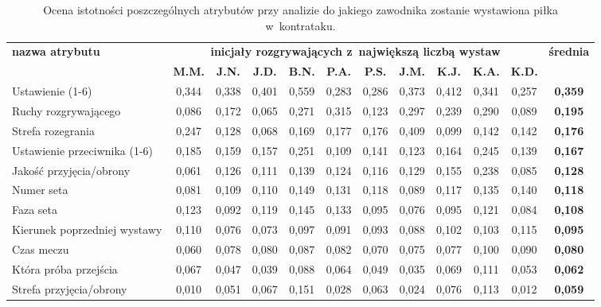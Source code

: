 \documentclass[a4paper,twoside,12pt]{book}
\begin{document}
\begin{table}
\centering
\caption{Ocena istotności poszczególnych atrybutów przy analizie do jakiego zawodnika zostanie wystawiona piłka w~kontrataku.}
\label{tab:atrybutyRZawodnikKontra}
\begin{adjustbox}{angle=90}
\begin{tabular}{|l|c|c|c|c|c|c|c|c|c|c|c|}
\hline
\multirow{2}{*}{\textbf{nazwa atrybutu}} &
\multicolumn{10}{c|}{\textbf{inicjały rozgrywających z~największą liczbą wystaw}} & 
\multirow{2}{*}{\textbf{średnia}}\\
\cline{2-11} & \textbf{M.M.} & \textbf{J.N.} & \textbf{J.D.} & \textbf{B.N.} & \textbf{P.A.} & \textbf{P.S.} & \textbf{J.M.} & \textbf{K.J.} & \textbf{K.A.} & \textbf{K.D.} &\\
\hline
Ustawienie (1-6) & \cellcolor{green}0,344 & \cellcolor{green}0,338 & \cellcolor{green}0,401 & \cellcolor{green}0,559 & 0,283 & \cellcolor{green}0,286 & 0,373 & \cellcolor{green}0,412 & \cellcolor{green}0,341 & \cellcolor{green}0,257 & \textbf{0,359} \\ \hline
Ruchy rozgrywającego & 0,086 & 0,172 & 0,065 & 0,271 & \cellcolor{green}0,315 & 0,123 & 0,297 & 0,239 & 0,290 & 0,089 & \textbf{0,195} \\ \hline
Strefa rozegrania & 0,247 & 0,128 & 0,068 & 0,169 & 0,177 & 0,176 & \cellcolor{green}0,409 & 0,099 & 0,142 & 0,142 & \textbf{0,176} \\ \hline
 Ustawienie przeciwnika (1-6) & 0,185 & 0,159 & 0,157 & 0,251 & 0,109 & 0,141 & 0,123 & 0,164 & 0,245 & 0,139 & \textbf{0,167} \\ \hline
Jakość przyjęcia/obrony & 0,061 & 0,126 & 0,111 & 0,139 & 0,124 & 0,116 & 0,129 & 0,155 & 0,238 & 0,085 & \textbf{0,128} \\ \hline
Numer seta & 0,081 & 0,109 & 0,110 & 0,149 & 0,131 & 0,118 & 0,089 & 0,117 & 0,135 & 0,140 & \textbf{0,118} \\ \hline
Faza seta & 0,123 & 0,092 & 0,119 & 0,145 & 0,133 & 0,095 & 0,076 & 0,095 & 0,121 & 0,084 & \textbf{0,108} \\ \hline
Kierunek poprzedniej wystawy & 0,110 & 0,076 & 0,073 & 0,097 & 0,091 & 0,093 & 0,088 & 0,102 & 0,103 & 0,115 & \textbf{0,095} \\ \hline
Czas meczu & 0,060 & 0,078 & 0,080 & 0,087 & 0,082 & 0,070 & 0,075 & 0,077 & 0,100 & 0,090 & \textbf{0,080} \\ \hline
Która próba przejścia & 0,067 & 0,047 & 0,039 & 0,088 & 0,064 & 0,049 & 0,035 & 0,069 & 0,111 & 0,053 & \textbf{0,062} \\ \hline
Strefa przyjęcia/obrony & 0,010 & 0,051 & 0,067 & 0,151 & 0,028 & 0,063 & 0,024 & 0,076 & 0,113 & 0,012 & \textbf{0,059} \\ \hline
\end{tabular}
\end{adjustbox}
\end{table}
\end{document}
